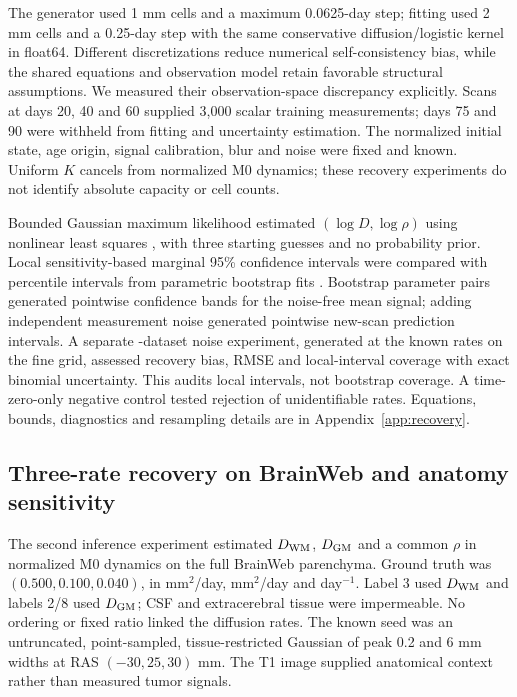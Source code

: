 The generator used 1 mm cells and a maximum 0.0625-day step; fitting used 2 mm cells and a 0.25-day step with the same conservative diffusion/logistic kernel in float64. Different discretizations reduce numerical self-consistency bias, while the shared equations and observation model retain favorable structural assumptions. We measured their observation-space discrepancy explicitly. Scans at days 20, 40 and 60 supplied 3,000 scalar training measurements; days 75 and 90 were withheld from fitting and uncertainty estimation. The normalized initial state, age origin, signal calibration, blur and noise were fixed and known. Uniform $K$ cancels from normalized M0 dynamics; these recovery experiments do not identify absolute capacity or cell counts.

Bounded Gaussian maximum likelihood estimated $(\log D,\log\rho)$ using nonlinear least squares \citep{virtanen2020}, with three starting guesses and no probability prior. Local sensitivity-based marginal 95\% confidence intervals were compared with percentile intervals from \RecoveryBootstraps{} parametric bootstrap fits \citep{efron1979}. Bootstrap parameter pairs generated pointwise confidence bands for the noise-free mean signal; adding independent measurement noise generated pointwise new-scan prediction intervals. A separate \RecoveryTrials{}-dataset noise experiment, generated at the known rates on the fine grid, assessed recovery bias, RMSE and local-interval coverage with exact binomial uncertainty. This audits local intervals, not bootstrap coverage. A time-zero-only negative control tested rejection of unidentifiable rates. Equations, bounds, diagnostics and resampling details are in Appendix~\ref{app:recovery}.

\subsection{Three-rate recovery on BrainWeb and anatomy sensitivity}\label{sec:bw_methods}
The second inference experiment estimated $D_{\rm WM}$, $D_{\rm GM}$ and a common $\rho$ in normalized M0 dynamics on the full BrainWeb parenchyma. Ground truth was $(0.500,0.100,0.040)$, in mm$^2$/day, mm$^2$/day and day$^{-1}$. Label 3 used $D_{\rm WM}$ and labels 2/8 used $D_{\rm GM}$; CSF and extracerebral tissue were impermeable. No ordering or fixed ratio linked the diffusion rates. The known seed was an untruncated, point-sampled, tissue-restricted Gaussian of peak 0.2 and 6 mm widths at RAS $(-30,25,30)$ mm. The T1 image supplied anatomical context rather than measured tumor signals.

